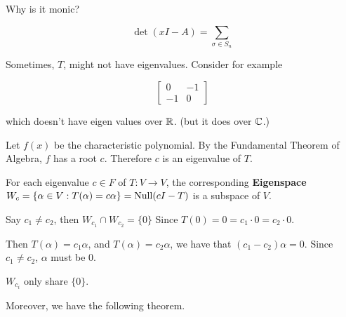 \documentclass[12pt]{article}
\begin{document}

  \QUESTION{} Why is it monic?

  \[
    \det(xI - A) = \sum_{\sigma \in S_n}
  \]

  Sometimes, $T$, might not have eigenvalues. Consider for example

  \[
    \begin{bmatrix}
      0 & -1 \\
      -1 & 0
    \end{bmatrix}
  \]

  which doesn't have eigen values over ${\mathbb R}$. (but it does over ${\mathbb C}$.)

  {
    Let $f(x)$ be the characteristic polynomial. By the Fundamental Theorem of
    Algebra, $f$ has a root $c$. Therefore $c$ is an eigenvalue of $T$.
  }

  For each eigenvalue $c \in F$ of $T: V \to V$, the corresponding {\bf
  Eigenspace} $W_c = \{\alpha \in V : T(\alpha) = c \alpha\} = \mathrm{Null}(cI - T)$
  is a subspace of $V$.


  Say $c_1 \ne c_2$, then $W_{c_1} \cap W_{c_2} = \{0\}$ Since $T(0) = 0 = c_1
  \cdot 0 = c_2 \cdot 0$.

  Then $T(\alpha) = c_1 \alpha$, and $T(\alpha) = c_2 \alpha$, we have that
  $(c_1 - c_2) \alpha = 0$. Since $c_1 \ne c_2$, $\alpha$ must be $0$.

  $W_{c_i}$ only share $\{0\}$.

  Moreover, we have the following theorem.
\end{document}
